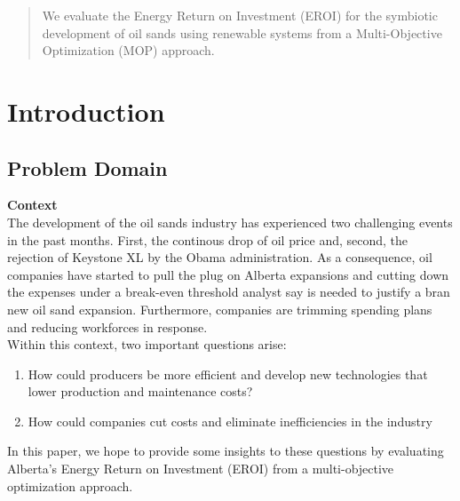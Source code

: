 \documentclass[12pt]{article}
\begin{document}
\maketitle

\begin{abstract}
We evaluate the Energy Return on Investment (EROI) for the symbiotic development of oil sands using renewable systems  from a Multi-Objective Optimization (MOP) approach. 
\end{abstract}

\tableofcontents
\newpage

\section{Introduction}

\subsection{Problem Domain}

{\bf Context} \\

The development of the oil sands industry has experienced two challenging events in the past months. First, the continous drop of oil price and, second,  the rejection of Keystone XL by the Obama administration. As a consequence, oil companies have started to pull the plug on Alberta expansions and cutting down the expenses under a break-even threshold analyst say is needed to justify a bran new oil sand expansion. Furthermore, companies are trimming spending plans and reducing workforces in response.  \\

Within this context, two important questions arise: 
  \begin{enumerate}
  \item How could producers be more efficient and develop new technologies that lower production and maintenance costs?
  \item How could companies cut costs and eliminate inefficiencies in the industry
  \end{enumerate}

In this paper, we hope to provide some insights to these questions by evaluating Alberta's Energy Return on Investment (EROI) from a multi-objective optimization approach. \\

\\
\end{document}
